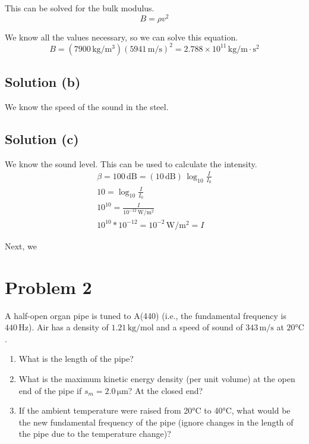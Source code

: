 \documentclass[12pt]{article}
\newcommand{\E}[1]{\times 10^{#1}}
\begin{document}
            This can be solved for the bulk modulus.
            \begin{equation}
                B   =   \rho v^2
            \end{equation}

            We know all the values necessary, so we can solve this equation.
            \begin{equation}
                B   =   (7900\,\unit{\kilo\gram/\meter^3}) (5941\,\unit{\meter/\second})^2
                    =   \boxed{2.788\E{11}\,\unit{\kilo\gram/\meter\cdot\second^2}}
            \end{equation}
        
        \subsection{Solution (b)}
            We know the speed of the sound in the steel. 

        \subsection{Solution (c)}
            We know the sound level.
            This can be used to calculate the intensity.
            \begin{gather}
                \beta   =   100\,\unit{\deci\bel}
                    =   (10\,\unit{\deci\bel})\,\log_{10}\frac{I}{I_0}\\
                10  =   \log_{10}\frac{I}{I_0}\\
                10^{10} =   \frac{I}{10^{-12}\,\unit{\watt/\meter^2}}\\
                10^{10} * 10^{-12}  =   10^{-2}\,\unit{\watt/\meter^2}
                    =   I
            \end{gather}
            
            Next, we 
        
    \section{Problem 2}
        A half-open organ pipe is tuned to A(440) (i.e., the fundamental frequency is $440\,\unit{\hertz}$).
        Air has a density of $1.21\,\unit{\kilo\gram/\mole}$ and a speed of sound of $343\,\unit{\meter/\second}$ at $20\unit{\celsius}$.
        
        \begin{enumerate}[label=\alph*.]
            \item   What is the length of the pipe?
            \item   What is the maximum kinetic energy density (per unit volume) at the open end of the pipe if $s_m = 2.0\,\unit{\micro\meter}$?  At the closed end?
            \item   If the ambient temperature were raised from 20\unit{\celsius} to 40\unit{\celsius}, what would be the new fundamental frequency of the pipe (ignore changes in the length of the pipe due to the temperature change)?
        \end{enumerate}
    
\end{document}
